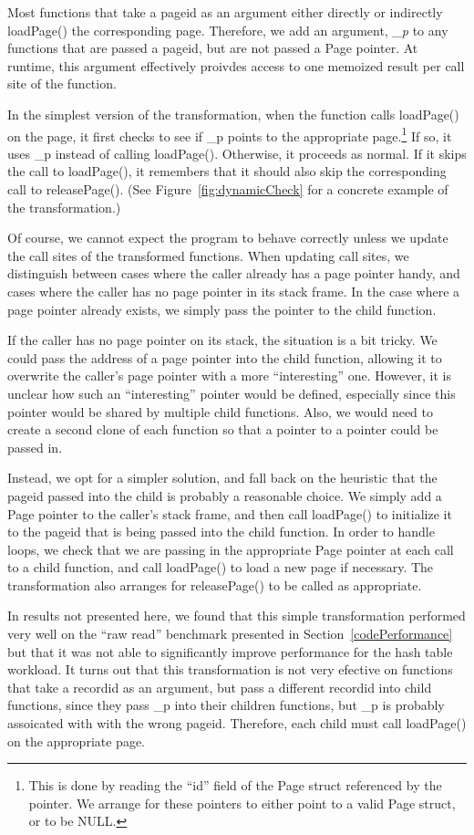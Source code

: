 \documentclass[10pt,letterpaper,twocolumn,english]{article}
\newcommand{\pin}{loadPage()\xspace}
\newcommand{\unpin}{releasePage()\xspace}
\newcommand{\PP}{\_p\xspace}
\begin{document}
Most functions that take a pageid as an argument either directly or
indirectly \pin the corresponding page.  Therefore, we add an
argument, {\em\PP} to any functions that are passed a pageid, but are
not passed a Page pointer.  At runtime, this argument effectively
proivdes access to one memoized result per call site of the
function.

In the simplest version of the transformation, when the function calls
\pin on the page, it first checks to see if \PP points to the
appropriate page.\footnote{This is done by reading the ``id'' field of
the Page struct referenced by the pointer.  We arrange for these
pointers to either point to a valid Page struct, or to be NULL.}  If
so, it uses \PP instead of calling \pin.  Otherwise, it proceeds as
normal.  If it skips the call to \pin, it remembers that it should
also skip the corresponding call to \unpin.  (See
Figure~\ref{fig:dynamicCheck} for a concrete example of the
transformation.)

Of course, we cannot expect the program to behave correctly unless we
update the call sites of the transformed functions.  When updating
call sites, we distinguish between cases where the caller already has
a page pointer handy, and cases where the caller has no page pointer
in its stack frame.  In the case where a page pointer already exists,
we simply pass the pointer to the child function.

If the caller has no page pointer on its stack, the situation is a bit
tricky.  We could pass the address of a page pointer into the child
function, allowing it to overwrite the caller's page pointer with a
more ``interesting'' one.  However, it is unclear how such an
``interesting'' pointer would be defined, especially since this
pointer would be shared by multiple child functions.  Also, we would need
to create a second clone of each function so that a pointer to a
pointer could be passed in.  

Instead, we opt for a simpler solution, and fall back on the heuristic
that the pageid passed into the child is probably a reasonable choice.
We simply add a Page pointer to the caller's stack frame, and then
call \pin to initialize it to the pageid that is being passed into the
child function.  In order to handle loops, we check that we are
passing in the appropriate Page pointer at each call to a child
function, and call \pin to load a new page if necessary.  The
transformation also arranges for \unpin to be called as appropriate.

In results not presented here, we found that this simple
transformation performed very well on the ``raw read'' benchmark
presented in Section~\ref{codePerformance} but that it was not able to
significantly improve performance for the hash table workload.  It
turns out that this transformation is not very efective on functions
that take a recordid as an argument, but pass a different recordid
into child functions, since they pass \PP into their children
functions, but \PP is probably assoicated with with the wrong pageid.
Therefore, each child must call \pin on the appropriate page. 
\end{document}
